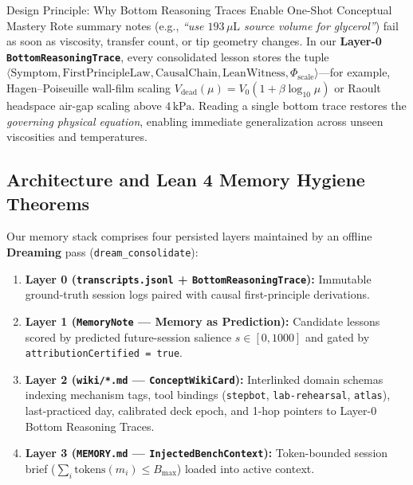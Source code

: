 \documentclass[10pt,letterpaper]{article}
\begin{document}
\begin{insightbox}{Design Principle: Why Bottom Reasoning Traces Enable One-Shot Conceptual Mastery}
Rote summary notes (e.g., \emph{``use $193\,\mu\text{L}$ source volume for glycerol''}) fail as soon as viscosity, transfer count, or tip geometry changes. In our \textbf{Layer-0 \texttt{BottomReasoningTrace}}, every consolidated lesson stores the tuple $\langle \mathrm{Symptom}, \mathrm{FirstPrincipleLaw}, \mathrm{CausalChain}, \mathrm{LeanWitness}, \Phi_{\mathrm{scale}}\rangle$—for example, Hagen--Poiseuille wall-film scaling $V_{\mathrm{dead}}(\mu) = V_0 (1 + \beta \log_{10}\mu)$ or Raoult headspace air-gap scaling above $4\,\text{kPa}$. Reading a single bottom trace restores the \emph{governing physical equation}, enabling immediate generalization across unseen viscosities and temperatures.
\end{insightbox}

\subsection{Architecture and Lean 4 Memory Hygiene Theorems}
Our memory stack comprises four persisted layers maintained by an offline \textbf{Dreaming} pass (\texttt{dream\_consolidate}):
\begin{enumerate}[leftmargin=1.6em, itemsep=2pt, topsep=2pt]
  \item \textbf{Layer 0 (\texttt{transcripts.jsonl} + \texttt{BottomReasoningTrace}):} Immutable ground-truth session logs paired with causal first-principle derivations.
  \item \textbf{Layer 1 (\texttt{MemoryNote} --- Memory as Prediction):} Candidate lessons scored by predicted future-session salience $s \in [0,1000]$ and gated by \texttt{attributionCertified = true}.
  \item \textbf{Layer 2 (\texttt{wiki/*.md} --- \texttt{ConceptWikiCard}):} Interlinked domain schemas indexing mechanism tags, tool bindings (\texttt{stepbot}, \texttt{lab-rehearsal}, \texttt{atlas}), last-practiced day, calibrated deck epoch, and 1-hop pointers to Layer-0 Bottom Reasoning Traces.
  \item \textbf{Layer 3 (\texttt{MEMORY.md} --- \texttt{InjectedBenchContext}):} Token-bounded session brief ($\sum_i \mathrm{tokens}(m_i) \le B_{\max}$) loaded into active context.
\end{enumerate}
\end{document}
